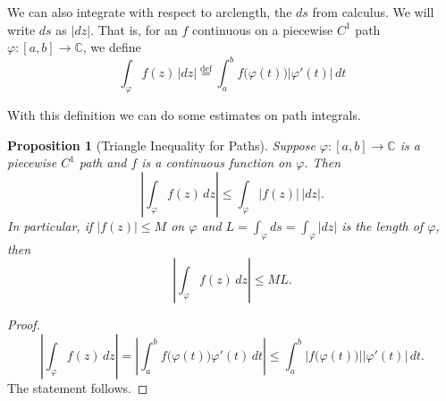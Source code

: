 \documentclass[12pt,openany]{book}
\newcommand{\sabs}[1]{\lvert {#1} \rvert}
\newcommand{\abs}[1]{\left\lvert {#1} \right\rvert}
\newcommand{\C}{{\mathbb{C}}}
\theoremstyle{plain}
\newtheorem{prop}[thm]{Proposition}
\theoremstyle{remark}
\theoremstyle{definition}
\theoremstyle{exercise}
\theoremstyle{example}
\begin{document}
\medskip

We can also integrate with respect to arclength, the $ds$ from calculus.
We will write $ds$ as $\sabs{dz}$.  That is, for an $f$ continuous on
a piecewise $C^1$ path $\varphi \colon [a,b] \to \C$,
we define
\begin{equation*}
\int_\varphi f(z) \, \sabs{dz}
\overset{\text{def}}{=}
\int_a^b f\bigl( \varphi(t) \bigr) \sabs{\varphi'(t)} \, dt
\end{equation*}

With this definition we can do some estimates on path integrals.

\begin{prop}[Triangle Inequality for Paths]
Suppose $\varphi \colon [a,b] \to \C$ is 
a piecewise $C^1$ path and $f$ is a continuous function on
$\varphi$.  Then
\begin{equation*}
\abs{\int_\varphi f(z) \, dz} \leq \int_\varphi \sabs{f(z)} \, \sabs{dz} .
\end{equation*}
In particular, if $\sabs{f(z)} \leq M$ on $\varphi$ and $L = \int_\varphi ds
= \int_{\varphi} \sabs{dz}$ is the length of $\varphi$, then
\begin{equation*}
\abs{\int_\varphi f(z) \, dz} \leq ML .
\end{equation*}
\end{prop} 

\begin{proof}
\begin{equation*}
\abs{\int_\varphi f(z) \, dz}
=
\abs{\int_a^b f\bigl( \varphi(t) \bigr) \varphi'(t) \, dt}
\leq
\int_a^b \sabs{ f\bigl( \varphi(t) \bigr) } \sabs{ \varphi'(t) } \, dt .
\end{equation*}
The statement follows.
\end{proof}
\end{document}
